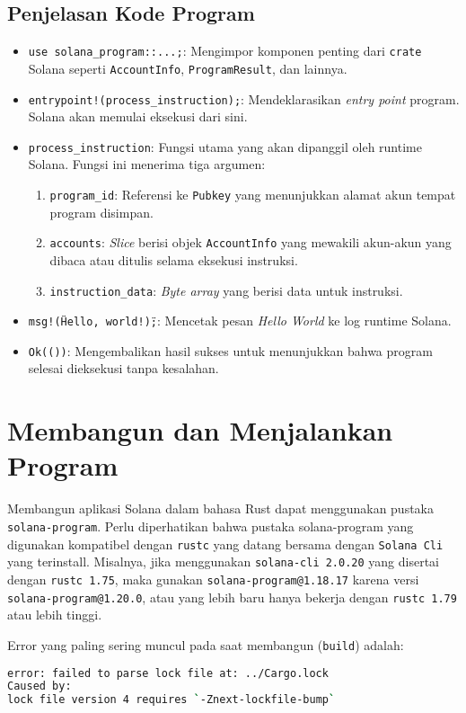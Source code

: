 \subsection{Penjelasan Kode Program}
\begin{itemize}
	\item \texttt{use solana\_program::{...};}: Mengimpor komponen penting dari \texttt{crate} Solana seperti \texttt{AccountInfo}, \texttt{ProgramResult}, dan lainnya.
	\item \texttt{entrypoint!(process\_instruction);}: Mendeklarasikan \textit{entry point} program. Solana akan memulai eksekusi dari sini.
	\item \texttt{process\_instruction}: Fungsi utama yang akan dipanggil oleh runtime Solana. Fungsi ini menerima tiga argumen:
	\begin{enumerate}
		\item \texttt{program\_id}: Referensi ke \texttt{Pubkey} yang menunjukkan alamat akun tempat program disimpan.
		\item \texttt{accounts}: \textit{Slice} berisi objek \texttt{AccountInfo} yang mewakili akun-akun yang dibaca atau ditulis selama eksekusi instruksi.
		\item \texttt{instruction\_data}: \textit{Byte array} yang berisi data untuk instruksi.
	\end{enumerate}
	\item \texttt{msg!(\"Hello, world!\");}: Mencetak pesan \textit{Hello World} ke log runtime Solana.
	\item \texttt{Ok(())}: Mengembalikan hasil sukses untuk menunjukkan bahwa program selesai dieksekusi tanpa kesalahan.
\end{itemize}

\section{Membangun dan Menjalankan Program}

Membangun aplikasi Solana dalam bahasa Rust dapat menggunakan pustaka \texttt{solana-program}. Perlu diperhatikan bahwa pustaka solana-program yang digunakan kompatibel dengan \texttt{rustc} yang datang bersama dengan \texttt{Solana Cli} yang terinstall. Misalnya, jika menggunakan \texttt{solana-cli 2.0.20} yang disertai dengan \texttt{rustc 1.75}, maka gunakan \texttt{solana-program@1.18.17}  karena versi \texttt{solana-program@1.20.0}, atau yang lebih baru hanya bekerja dengan \texttt{rustc 1.79} atau lebih tinggi. 

Error yang paling sering muncul pada saat membangun (\texttt{build}) adalah:
 \begin{lstlisting}[language=bash]
error: failed to parse lock file at: ../Cargo.lock
Caused by:
lock file version 4 requires `-Znext-lockfile-bump`
\end{lstlisting}

